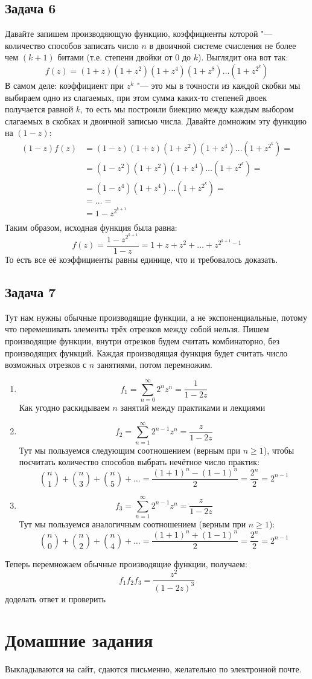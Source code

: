 \subsection{Задача 6}
	Давайте запишем производяющую функцию, коэффициенты которой "--- количество способов записать число $n$
	в двоичной системе счисления не более чем $(k+1)$ битами (т.е. степени двойки от 0 до $k$).
	Выглядит она вот так:
	\[ f(z) = (1+z)(1+z^2)(1+z^4)(1+z^8)\dots(1+z^{2^k}) \]
	В самом деле: коэффициент при $z^k$ "--- это мы в точности из каждой скобки мы выбираем одно из слагаемых,
	при этом сумма каких-то степеней двоек получается равной $k$, то есть мы построили биекцию
	между каждым выбором слагаемых в скобках и двоичной записью числа.
	Давайте домножим эту функцию на $(1-z)$:
	\begin{align*}
		(1-z)f(z)
		&= (1-z)(1+z)(1+z^2)(1+z^4)\dots(1+z^{2^k}) = \\
		&= (1-z^2)(1+z^2)(1+z^4)\dots(1+z^{2^k}) = \\
		&= (1-z^4)(1+z^4)\dots(1+z^{2^k}) = \\
		&= \dots = \\
		&= 1-z^{2^{k+1}} \\
	\end{align*}
	Таким образом, исходная функция была равна:
	\[
		f(z) = \frac{1-z^{2^{k+1}}}{1-z} = 1 + z + z^2 + \dots + z^{2^{k+1}-1}
	\]
	То есть все её коэффициенты равны единице, что и требовалось доказать.

\subsection{Задача 7}
	Тут нам нужны обычные производящие функции, а не экспоненциальные, потому что перемешивать
	элементы трёх отрезков между собой нельзя.
	Пишем производящие функции, внутри отрезков будем считать комбинаторно, без производящих функций.
	Каждая производящая функция будет считать число возможных отрезков с $n$ занятиями, потом перемножим.
	\begin{enumerate}
		\item
			\[ f_1=\sum_{n=0}^\infty 2^nz^n = \frac{1}{1-2z}\]
			Как угодно раскидываем $n$ занятий между практиками и лекциями
		\item
			\[ f_2=\sum_{n=1}^\infty 2^{n-1}z^n = \frac{z}{1-2z} \]
			Тут мы пользуемся следующим соотношением (верным при $n \ge 1$), чтобы посчитать количество способов выбрать нечётное число практик:
			\[ \binom{n}{1}+\binom{n}{3}+\binom{n}{5}+\dots = \frac{(1+1)^n-(1-1)^n}{2} = \frac{2^n}{2} = 2^{n-1} \]
		\item
			\[ f_3=\sum_{n=1}^\infty 2^{n-1}z^n = \frac{z}{1-2z} \]
			Тут мы пользуемся аналогичным соотношением (верным при $n \ge 1$):
			\[ \binom{n}{0}+\binom{n}{2}+\binom{n}{4}+\dots = \frac{(1+1)^n+(1-1)^n}{2} = \frac{2^n}{2} = 2^{n-1} \]
	\end{enumerate}
	Теперь перемножаем обычные производящие функции, получаем:
	\[ f_1f_2f_3 = \frac{z^2}{(1-2z)^3} \]
	\TODO доделать ответ и проверить

\section{Домашние задания}
	Выкладываются на сайт, сдаются письменно, желательно по электронной почте.

